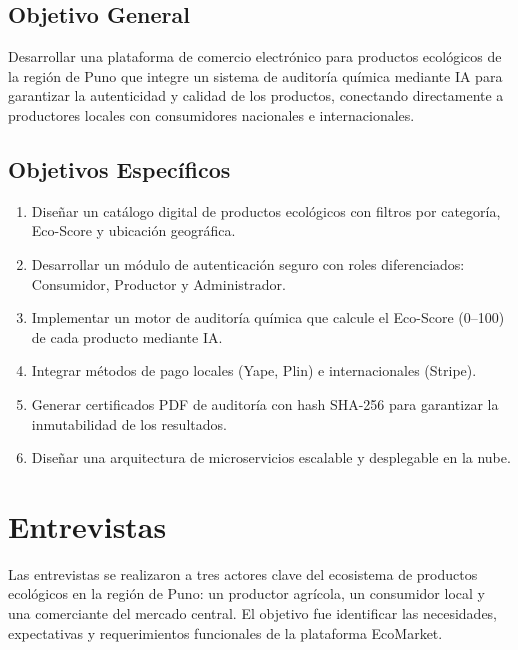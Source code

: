 \documentclass[12pt,a4paper]{article}
\begin{document}
\subsection{Objetivo General}

Desarrollar una plataforma de comercio electr\'onico para productos ecol\'ogicos de la
regi\'on de Puno que integre un sistema de auditor\'ia qu\'imica mediante IA para
garantizar la autenticidad y calidad de los productos, conectando directamente a
productores locales con consumidores nacionales e internacionales.

\subsection{Objetivos Espec\'ificos}

\begin{enumerate}[leftmargin=1.5cm]
  \item Dise\~nar un cat\'alogo digital de productos ecol\'ogicos con filtros por categor\'ia,
    Eco-Score y ubicaci\'on geogr\'afica.
  \item Desarrollar un m\'odulo de autenticaci\'on seguro con roles diferenciados:
    Consumidor, Productor y Administrador.
  \item Implementar un motor de auditor\'ia qu\'imica que calcule el Eco-Score (0--100)
    de cada producto mediante IA.
  \item Integrar m\'etodos de pago locales (Yape, Plin) e internacionales (Stripe).
  \item Generar certificados PDF de auditor\'ia con hash SHA-256 para garantizar la
    inmutabilidad de los resultados.
  \item Dise\~nar una arquitectura de microservicios escalable y desplegable en la nube.
\end{enumerate}

\newpage

\section{Entrevistas}

Las entrevistas se realizaron a tres actores clave del ecosistema de productos
ecol\'ogicos en la regi\'on de Puno: un productor agr\'icola, un consumidor local y una
comerciante del mercado central. El objetivo fue identificar las necesidades,
expectativas y requerimientos funcionales de la plataforma EcoMarket.
\end{document}
